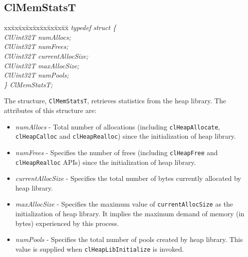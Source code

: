 \begin{flushleft}
\subsection{ClMemStatsT}
\begin{tabbing}
xx\=xx\=xx\=xx\=xx\=xx\=xx\=xx\=xx\=\kill
\textit{typedef struct \{}\\
\>\>\>\>\textit{ClUint32T   numAllocs;}\\
\>\>\>\>\textit{ClUint32T   numFrees;}\\
\>\>\>\>\textit{ClUint32T   currentAllocSize;}\\
\>\>\>\>\textit{ClUint32T   maxAllocSize;}\\
\>\>\>\>\textit{ClUint32T   numPools;}\\
\textit{\} ClMemStatsT;}
\end{tabbing} The structure, {\tt{ClMemStatsT}}, retrieves statistics from the heap library. The attributes of this structure are:
\begin{itemize}
\item \textit{numAllocs} - Total number of allocations (including {\tt{clHeapAllocate}}, {\tt{clHeapCalloc}} and {\tt{clHeapRealloc}}) since the 
initialization of heap library.
\item \textit{numFrees} - Specifies the number of frees (including {\tt{clHeapFree}} and {\tt{clHeapRealloc}} APIs) since the initialization of heap library.
\item \textit{currentAllocSize} - Specifies the total number of bytes currently allocated by heap library.
\item \textit{maxAllocSize} - Specifies the maximum value of {\tt{currentAllocSize}} as the initialization of heap library. It implies the maximum 
demand of memory (in bytes) experienced by this process.
\item \textit{numPools} - Specifies the total number of pools created by heap library. This value is supplied when
{\tt{clHeapLibInitialize}} is invoked.
\end{itemize}



\end{flushleft}
